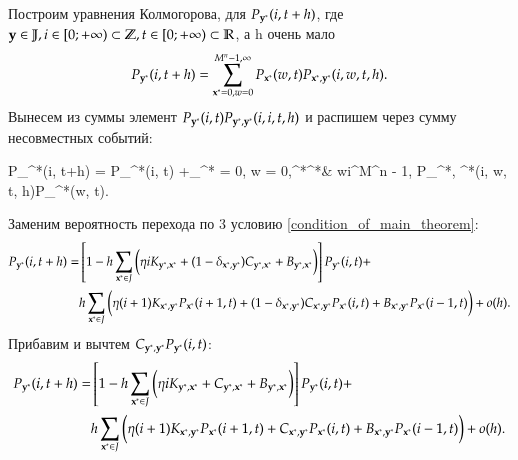 Построим уравнения Колмогорова, для \(P_{\bold{y}^*}(i, t + h)\), где \\
\(\bold{y} \in \mathbb{J}, i \in [0;+\infty) \subset \mathbb{Z}, t \in [0;+\infty) \subset \mathbb{R}\), а h очень мало
\[P_{\bold{y}^*}(i, t+h) = \sum_{\bold{x}^* = 0, w = 0}^{M^n - 1,\infty}P_{\bold{x}^*}(w, t)P_{\bold{x}^*, \bold{y}^*}(i, w, t, h).\]
Вынесем из суммы элемент \(P_{\bold{y}^*}(i, t)P_{\bold{y}^*, \bold{y}^*}(i, i, t, h)\) и распишем через сумму несовместных событий:
\begin{urv}{60} 
	P_{^*}(i, t+h) = \left[1 - \sum_{\bold{x}^* = 0, w = 0,\atop \bold{x}^*\neq \bold{y}^*\& w\neq i}^{M^n - 1,\infty}
	P_{\bold{y}^*, \bold{x}^*}(i, w, t, h)\right]P_{^*}(i, t)
	+\sum_{^* = 0, w = 0,\atop {}^*\neq {}^*\& w\neq i}^{M^n - 1,\infty}
	P_{^*, ^*}(i, w, t, h)P_{^*}(w, t).
\end{urv}
Заменим вероятность перехода по 3 условию \eqref{condition_of_main_theorem}:
\begin{align*}
	P_{\bold{y}^*}(i, t+h) =
	& \left[1 - h \sum_{\bold{x}^* \in J}
	\bigg(\eta i K_{\bold{y}^*, \bold{x}^*}
        + (1 - \delta_{\bold{x}^*, \bold{y}^*}) 
			 C_{\bold{y}^*, \bold{x}^*}
        + B_{\bold{y}^*, \bold{x}^*}\bigg)
	\right]P_{\bold{y}^*}(i, t)+\\
	&h\sum_{\bold{x}^* \in J}
	\bigg(\eta (i+1) K_{\bold{x}^*, \bold{y}^*}P_{\bold{x}^*}(i+1, t)
        + (1 - \delta_{\bold{x}^*, \bold{y}^*}) 
			C_{\bold{x}^*, \bold{y}^*}P_{\bold{x}^*}(i, t)
        + B_{\bold{x}^*, \bold{y}^*}P_{\bold{x}^*}(i-1, t) \bigg)+o(h).
\end{align*}
Прибавим и вычтем \(C_{\bold{y}^*,\bold{y}^*}P_{\bold{y}^*}(i, t)\):
\begin{align*} 
    P_{\bold{y}^*}(i, t+h) =
    & \left[1 - h \sum_{\bold{x}^* \in J}
    \bigg(\eta i K_{\bold{y}^*, \bold{x}^*}
        + C_{\bold{y}^*, \bold{x}^*} 
        + B_{\bold{y}^*, \bold{x}^*}\bigg)
    \right]P_{\bold{y}^*}(i, t)+\\ 
    &h\sum_{\bold{x}^* \in J} 
    \bigg(\eta (i+1) K_{\bold{x}^*, \bold{y}^*}P_{\bold{x}^*}(i+1, t)
        + C_{\bold{x}^*, \bold{y}^*}P_{\bold{x}^*}(i, t) 
        + B_{\bold{x}^*, \bold{y}^*}P_{\bold{x}^*}(i-1, t) \bigg)+o(h).
\end{align*} 
\begin{comment}
\begin{align*}
	P_{\bold{y}^*}(i, t+h) =& \left[2 - h 
	\sum_{\bold{x}^* \in J}\kronsum{\bold{y}^*, \bold{x}^*}
	\right]P_{\bold{y}^*}(i, t)+\\
	&h\sum_{\bold{x}^* \in J}\sum_{w=0,\atop \bold{x}^*\neq \bold{y}^*\& w\neq i}^{\infty}
	L^{(i-w)}_{\bold{x}^*, \bold{y}^*}(w)P_{\bold{x}^*}(w, t)+o(h).
\end{align*}
\end{comment}
